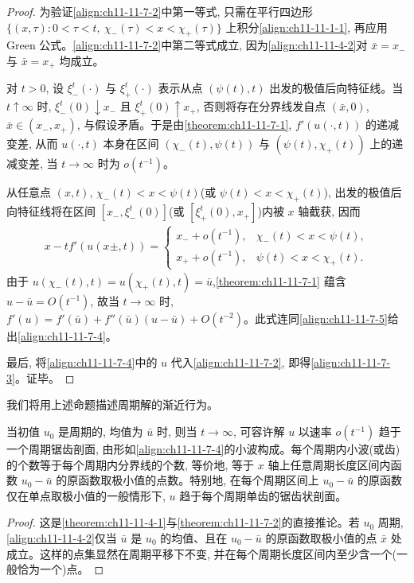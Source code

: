 \documentclass[../../main.tex]{subfiles}
\begin{document}
\begin{proof}
为验证\eqref{align:ch11-11-7-2}中第一等式, 只需在平行四边形 $\{(x,\tau):0<\tau<t,\ \chi_-(\tau)<x<\chi_+(\tau)\}$ 上积分\eqref{align:ch11-11-1-1}, 再应用 Green 公式。\eqref{align:ch11-11-7-2}中第二等式成立, 因为\eqref{align:ch11-11-4-2}对 $\bar x=x_-$ 与 $\bar x=x_+$ 均成立。

对 $t>0$, 设 $\xi_-^t(\cdot)$ 与 $\xi_+^t(\cdot)$ 表示从点 $(\psi(t),t)$ 出发的极值后向特征线。当 $t\uparrow\infty$ 时, $\xi_-^t(0)\downarrow x_-$ 且 $\xi_+^t(0)\uparrow x_+$, 否则将存在分界线发自点 $(\bar x,0)$, $\bar x\in(x_-,x_+)$, 与假设矛盾。于是由\cref{theorem:ch11-11-7-1}, $f'(u(\cdot,t))$ 的递减变差, 从而 $u(\cdot,t)$ 本身在区间 $(\chi_-(t),\psi(t))$ 与 $(\psi(t),\chi_+(t))$ 上的递减变差, 当 $t\to\infty$ 时为 $o(t^{-1})$。

从任意点 $(x,t)$, $\chi_-(t)<x<\psi(t)$(或 $\psi(t)<x<\chi_+(t)$), 出发的极值后向特征线将在区间 $[x_-,\xi_-^t(0)]$(或 $[\xi_+^t(0),x_+]$)内被 $x$ 轴截获, 因而
\begin{align}
x-tf'(u(x\pm,t))=
\begin{cases}
x_-+o(t^{-1}), & \chi_-(t)<x<\psi(t),\\
x_++o(t^{-1}), & \psi(t)<x<\chi_+(t).
\end{cases}\label{align:ch11-11-7-5}
\end{align}
由于 $u(\chi_-(t),t)=u(\chi_+(t),t)=\bar u$,\cref{theorem:ch11-11-7-1} 蕴含 $u-\bar u=O(t^{-1})$, 故当 $t\to\infty$ 时, $f'(u)=f'(\bar u)+f''(\bar u)(u-\bar u)+O(t^{-2})$。此式连同\eqref{align:ch11-11-7-5}给出\eqref{align:ch11-11-7-4}。

最后, 将\eqref{align:ch11-11-7-4}中的 $u$ 代入\eqref{align:ch11-11-7-2}, 即得\eqref{align:ch11-11-7-3}。证毕。
\end{proof}

我们将用上述命题描述周期解的渐近行为。

\begin{theorem}\label{theorem:ch11-11-7-3}
当初值 $u_0$ 是周期的, 均值为 $\bar u$ 时, 则当 $t\to\infty$, 可容许解 $u$ 以速率 $o(t^{-1})$ 趋于一个周期锯齿剖面, 由形如\eqref{align:ch11-11-7-4}的小波构成。每个周期内小波(或齿)的个数等于每个周期内分界线的个数, 等价地, 等于 $x$ 轴上任意周期长度区间内函数 $u_0-\bar u$ 的原函数取极小值的点数。特别地, 在每个周期区间上 $u_0-\bar u$ 的原函数仅在单点取极小值的一般情形下, $u$ 趋于每个周期单齿的锯齿状剖面。
\end{theorem}

\begin{proof}
这是\cref{theorem:ch11-11-4-1}与\cref{theorem:ch11-11-7-2}的直接推论。若 $u_0$ 周期, \eqref{align:ch11-11-4-2}仅当 $\bar u$ 是 $u_0$ 的均值、且在 $u_0-\bar u$ 的原函数取极小值的点 $\bar x$ 处成立。这样的点集显然在周期平移下不变, 并在每个周期长度区间内至少含一个(一般恰为一个)点。
\end{proof}
\end{document}

